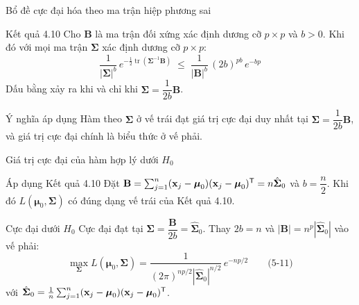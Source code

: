 \begin{frame}{Bổ đề cực đại hóa theo ma trận hiệp phương sai}
  \begin{block}{Kết quả 4.10}
    Cho $\mathbf{B}$ là ma trận đối xứng xác định dương cỡ $p \times p$ và $b > 0$. Khi đó với mọi ma trận $\boldsymbol{\Sigma}$ xác định dương cỡ $p \times p$:
    \[
      \frac{1}{|\boldsymbol{\Sigma}|^{b}} \, e^{-\frac{1}{2}\operatorname{tr}\left(\boldsymbol{\Sigma}^{-1}\mathbf{B}\right)}
      \;\le\;
      \frac{1}{|\mathbf{B}|^{b}} \, (2b)^{pb} \, e^{-bp}
    \]
    Dấu bằng xảy ra khi và chỉ khi $\boldsymbol{\Sigma} = \dfrac{1}{2b}\mathbf{B}$.
  \end{block}

  \begin{exampleblock}{Ý nghĩa áp dụng}
    Hàm theo $\boldsymbol{\Sigma}$ ở vế trái đạt giá trị cực đại duy nhất tại $\boldsymbol{\Sigma} = \dfrac{1}{2b}\mathbf{B}$, và giá trị cực đại chính là biểu thức ở vế phải.
  \end{exampleblock}
\end{frame}

\begin{frame}{Giá trị cực đại của hàm hợp lý dưới \texorpdfstring{$H_0$}{H0}}
  \begin{block}{Áp dụng Kết quả 4.10}
    Đặt $\mathbf{B} = \sum_{j=1}^n (\mathbf{x}_j - \boldsymbol{\mu}_0)(\mathbf{x}_j - \boldsymbol{\mu}_0)^{\mathsf T} = n\hat{\boldsymbol{\Sigma}}_0$ và $b = \dfrac{n}{2}$. Khi đó $L(\boldsymbol{\mu}_0, \boldsymbol{\Sigma})$ có đúng dạng vế trái của Kết quả 4.10.
  \end{block}

  \begin{alertblock}{Cực đại dưới $H_0$}
    Cực đại đạt tại $\boldsymbol{\Sigma} = \dfrac{\mathbf{B}}{2b} = \hat{\boldsymbol{\Sigma}}_0$. Thay $2b = n$ và $|\mathbf{B}| = n^p|\hat{\boldsymbol{\Sigma}}_0|$ vào vế phải:
    \vspace{-4pt}
    \begin{equation*}
      \max_{\boldsymbol{\Sigma}} L(\boldsymbol{\mu}_0, \boldsymbol{\Sigma})
      = \frac{1}{(2\pi)^{np/2}|\hat{\boldsymbol{\Sigma}}_0|^{n/2}} \, e^{-np/2} \qquad \text{(5-11)}
    \end{equation*}
    với $\hat{\boldsymbol{\Sigma}}_0 = \frac{1}{n}\sum_{j=1}^n (\mathbf{x}_j - \boldsymbol{\mu}_0)(\mathbf{x}_j - \boldsymbol{\mu}_0)^{\mathsf T}$.
  \end{alertblock}
\end{frame}

